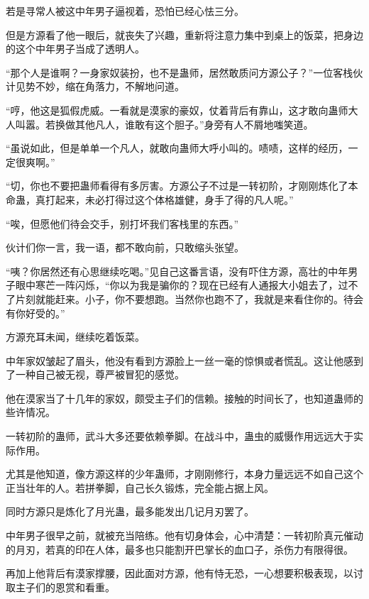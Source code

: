 
\begin{this_body}



若是寻常人被这中年男子逼视着，恐怕已经心怯三分。

但是方源看了他一眼后，就丧失了兴趣，重新将注意力集中到桌上的饭菜，把身边的这个中年男子当成了透明人。

“那个人是谁啊？一身家奴装扮，也不是蛊师，居然敢质问方源公子？”一位客栈伙计见势不妙，缩在角落力，不解地问道。

“哼，他这是狐假虎威。一看就是漠家的豪奴，仗着背后有靠山，这才敢向蛊师大人叫嚣。若换做其他凡人，谁敢有这个胆子。”身旁有人不屑地嗤笑道。

“虽说如此，但是单单一个凡人，就敢向蛊师大呼小叫的。啧啧，这样的经历，一定很爽啊。”

“切，你也不要把蛊师看得有多厉害。方源公子不过是一转初阶，才刚刚炼化了本命蛊，真打起来，未必打得过这个体格雄健，身手了得的凡人呢。”

“唉，但愿他们待会交手，别打坏我们客栈里的东西。”

伙计们你一言，我一语，都不敢向前，只敢缩头张望。

“咦？你居然还有心思继续吃喝。”见自己这番言语，没有吓住方源，高壮的中年男子眼中寒芒一阵闪烁，“你以为我是骗你的？现在已经有人通报大小姐去了，过不了片刻就能赶来。小子，你不要想跑。当然你也跑不了，我就是来看住你的。待会有你好受的。”

方源充耳未闻，继续吃着饭菜。

中年家奴皱起了眉头，他没有看到方源脸上一丝一毫的惊惧或者慌乱。这让他感到了一种自己被无视，尊严被冒犯的感觉。

他在漠家当了十几年的家奴，颇受主子们的信赖。接触的时间长了，也知道蛊师的些许情况。

一转初阶的蛊师，武斗大多还要依赖拳脚。在战斗中，蛊虫的威慑作用远远大于实际作用。

尤其是他知道，像方源这样的少年蛊师，才刚刚修行，本身力量远远不如自己这个正当壮年的人。若拼拳脚，自己长久锻炼，完全能占据上风。

同时方源只是炼化了月光蛊，最多能发出几记月刃罢了。

中年男子很早之前，就被充当陪练。他有切身体会，心中清楚：一转初阶真元催动的月刃，若真的印在人体，最多也只能割开巴掌长的血口子，杀伤力有限得很。

再加上他背后有漠家撑腰，因此面对方源，他有恃无恐，一心想要积极表现，以讨取主子们的恩赏和看重。


\end{this_body}
